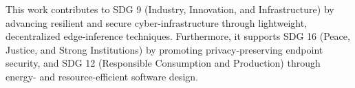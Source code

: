 
%

%

This work contributes to SDG 9 (Industry, Innovation, and Infrastructure) by advancing resilient and secure cyber-infrastructure through lightweight, decentralized edge-inference techniques. Furthermore, it supports SDG 16 (Peace, Justice, and Strong Institutions) by promoting privacy-preserving endpoint security, and SDG 12 (Responsible Consumption and Production) through energy- and resource-efficient software design.
